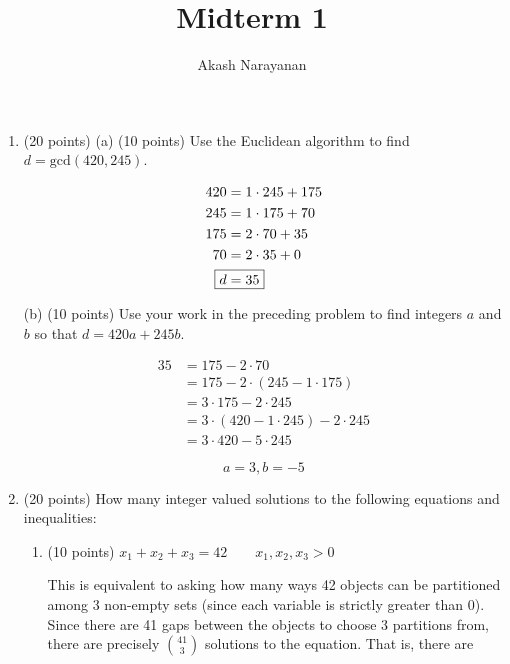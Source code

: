 \documentclass[12pt]{article}
\title{Midterm 1}
\author{Akash Narayanan}
\begin{document}
  \maketitle

  \begin{enumerate}
    \item (20 points) (a) (10 points) Use the Euclidean algorithm to find \(d = \text{gcd}(420, 245)\).

    \begin{align*}
      420 &= 1 \cdot 245 + 175 \\
      245 &= 1 \cdot 175 + 70  \\
      175 &= 2 \cdot 70  + 35  \\
      70  &= 2 \cdot 35  + 0   \\
      \Aboxed{d &= 35}
    \end{align*}

    (b) (10 points) Use your work in the preceding problem to find integers \(a\) and \(b\) so that \(d = 420a + 245b\).

    \begin{align*}
      35 &= 175 - 2 \cdot 70 \\
         &= 175 - 2 \cdot (245 - 1 \cdot 175) \\
         &= 3 \cdot 175 - 2 \cdot 245 \\
         &= 3 \cdot (420 - 1 \cdot 245) - 2 \cdot 245 \\
         &= 3 \cdot 420 - 5 \cdot 245
    \end{align*}

    \begin{equation*}
      \boxed{a = 3, b = -5}
    \end{equation*}

    \pagebreak

    \item (20 points) How many integer valued solutions to the following equations and inequalities:

    \begin{enumerate}
      \item (10 points) \(x_{1} + x_{2} + x_{3} = 42 \qquad x_{1}, x_{2}, x_{3} > 0\)

      This is equivalent to asking how many ways 42 objects can be partitioned among 3 non-empty sets (since each variable is strictly greater than 0). Since there are 41 gaps between the objects to choose 3 partitions from, there are precisely \(41 \choose 3\) solutions to the equation. That is, there are 


\end{enumerate}
\end{enumerate}
\end{document}
